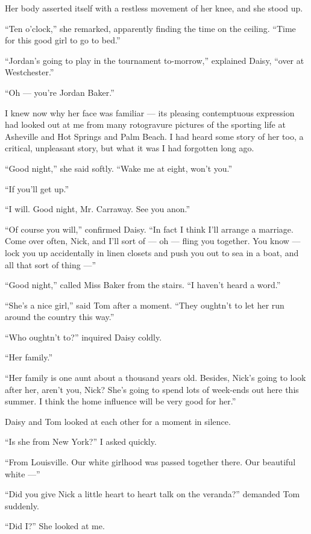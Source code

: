 \documentclass{znotebook}
\begin{document}
Her body asserted itself with a restless movement of her knee, and she stood up.

``Ten o'clock,'' she remarked, apparently finding the time on the ceiling. ``Time for this good girl to go to bed.''

``Jordan's going to play in the tournament to-morrow,'' explained Daisy, ``over at Westchester.''

``Oh ---{} you're Jordan Baker.''

I knew now why her face was familiar ---{} its pleasing contemptuous expression had looked out at me from many rotogravure pictures of the sporting life at Asheville and Hot Springs and Palm Beach. I had heard some story of her too, a critical, unpleasant story, but what it was I had forgotten long ago.

``Good night,'' she said softly. ``Wake me at eight, won't you.''

``If you'll get up.''

``I will. Good night, Mr. Carraway. See you anon.''

``Of course you will,'' confirmed Daisy. ``In fact I think I'll arrange a marriage. Come over often, Nick, and I'll sort of ---{} oh ---{} fling you together. You know ---{} lock you up accidentally in linen closets and push you out to sea in a boat, and all that sort of thing ---''

``Good night,'' called Miss Baker from the stairs. ``I haven't heard a word.''

``She's a nice girl,'' said Tom after a moment. ``They oughtn't to let her run around the country this way.''

``Who oughtn't to?'' inquired Daisy coldly.

``Her family.''

``Her family is one aunt about a thousand years old. Besides, Nick's going to look after her, aren't you, Nick? She's going to spend lots of week-ends out here this summer. I think the home influence will be very good for her.''

Daisy and Tom looked at each other for a moment in silence.

``Is she from New York?'' I asked quickly.

``From Louisville. Our white girlhood was passed together there. Our beautiful white ---''

``Did you give Nick a little heart to heart talk on the veranda?'' demanded Tom suddenly.

``Did I?'' She looked at me.
\end{document}
